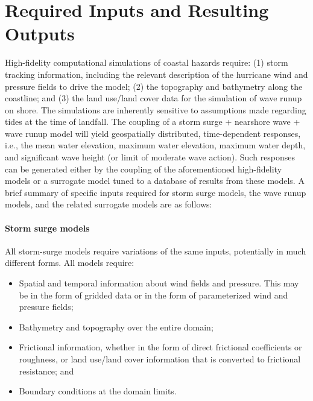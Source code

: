 \section{Required Inputs and Resulting Outputs}
\label{sec:storm_surge_io}

High-fidelity computational simulations of coastal hazards require: (1) storm tracking information, including the relevant description of the hurricane wind and pressure fields to drive the model; (2) the topography and bathymetry along the coastline; and (3) the land use/land cover data for the simulation of wave runup on shore. The simulations are inherently sensitive to assumptions made regarding tides at the time of landfall. The coupling of a storm surge + nearshore wave + wave runup model will yield geospatially distributed, time-dependent responses, i.e., the mean water elevation, maximum water elevation, maximum water depth, and significant wave height (or limit of moderate wave action). Such responses can be generated either by the coupling of the aforementioned high-fidelity models or a surrogate model tuned to a database of results from these models. A brief summary of specific inputs required for storm surge models, the wave runup models, and the related surrogate models are as follows:

\paragraph{Storm surge models} All storm-surge models require variations of the same inputs, potentially in much different forms. All models require:

\begin{itemize}
    \item Spatial and temporal information about wind fields and pressure. This may be in the form of gridded data or in the form of parameterized wind and pressure fields;
\vspace{2mm}
    \item Bathymetry and topography over the entire domain;
\vspace{2mm}
    \item Frictional information, whether in the form of direct frictional coefficients or roughness, or land use/land cover information that is converted to frictional resistance; and
\vspace{2mm}
    \item Boundary conditions at the domain limits.
\end{itemize}

